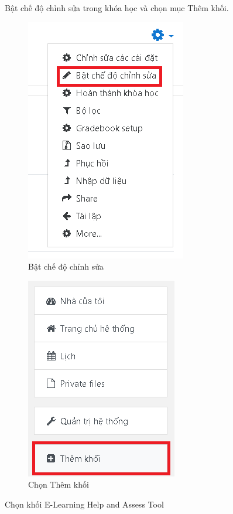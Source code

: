 \newpage
Bật chế độ chỉnh sửa trong khóa học và chọn mục Thêm khối.

\begin{center}
	\begin{figure}[htp]
		\begin{center}
			\includegraphics[width=0.4\linewidth]{img/36}
		\end{center}
		\caption{Bật chế độ chỉnh sửa}
		\label{refhinh44}
	\end{figure}
\end{center}

\begin{center}
	\begin{figure}[htp]
		\begin{center}
			\includegraphics[width=0.35\linewidth]{img/38}
		\end{center}
		\caption{Chọn Thêm khối}
		\label{refhinh46}
	\end{figure}
\end{center}

\newpage
Chọn khối E-Learning Help and Assess Tool


